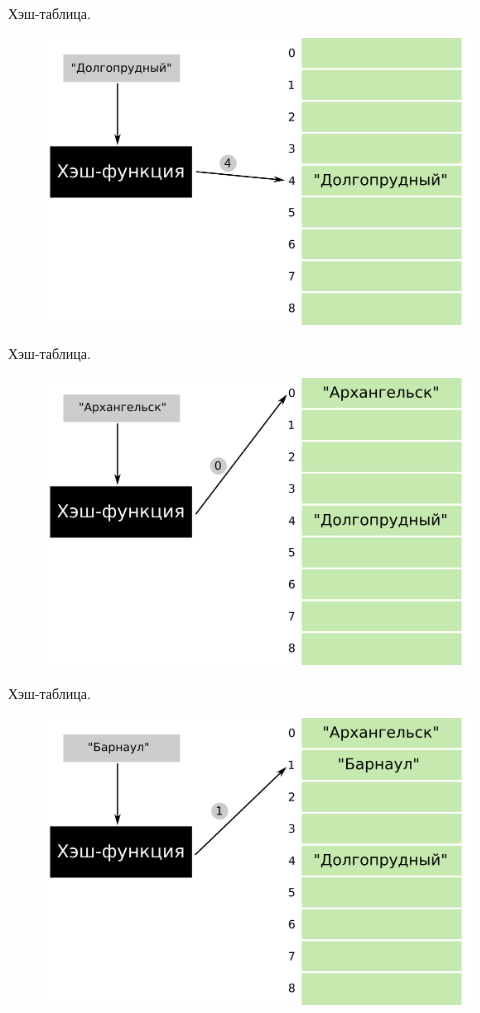 \documentclass[10pt]{beamer}
\begin{document}
\begin{frame}{Хэш-таблица.}
\begin{figure}
\centerline{\includegraphics[width=0.86\linewidth]{images/hash_3.png}}
\end{figure}
\end{frame}

\begin{frame}{Хэш-таблица.}
\begin{figure}
\centerline{\includegraphics[width=0.86\linewidth]{images/hash_4.png}}
\end{figure}
\end{frame}

\begin{frame}{Хэш-таблица.}
\begin{figure}
\centerline{\includegraphics[width=0.86\linewidth]{images/hash_5.png}}
\end{figure}
\end{frame}
\end{document}
